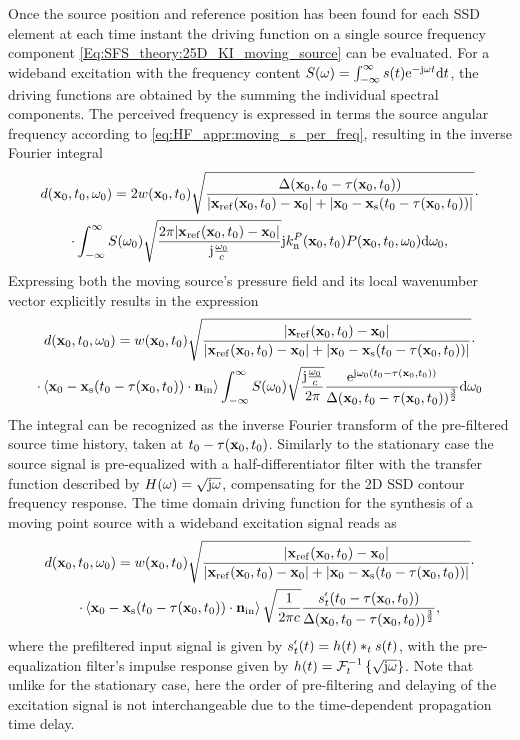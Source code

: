 Once the source position and reference position has been found for each SSD element at each time instant the driving function on a single source frequency component \eqref{Eq:SFS_theory:25D_KI_moving_source} can be evaluated.
For a wideband excitation with the frequency content $S(\omega) = \int_{-\infty}^{\infty} s(t) \mathrm{e}^{-\mathrm{j} \omega t} \mathrm{d} t$, the driving functions are obtained by the summing the individual spectral components.
The perceived frequency is expressed in terms the source angular frequency according to \eqref{eq:HF_appr:moving_s_per_freq}, resulting in the inverse Fourier integral
\begin{multline}
\small
d(\mathbf{x}_0,t_0,\omega_0) =2 w(\mathbf{x}_0,t_0) 
\sqrt{\frac{\Delta(\mathbf{x}_0,t_0-\tau(\mathbf{x}_0,t_0))}{|\mathbf{x}_{\mathrm{ref}}(\mathbf{x}_0,t_0)-\mathbf{x}_0|+|\mathbf{x}_0 - \mathbf{x}_{\mathrm{s}}(t_0-\tau(\mathbf{x}_0,t_0))|}}
\cdot \\ \cdot
 \int_{-\infty}^{\infty} S(\omega_0)
\sqrt{\frac{2\pi |\mathbf{x}_{\mathrm{ref}}(\mathbf{x}_0,t_0)-\mathbf{x}_0|}{\mathrm{j} \frac{\omega_0}{c} }}
\mathrm{j} k_{\mathrm{n}}^P(\mathbf{x}_0,t_0) P(\mathbf{x}_0,t_0,\omega_0) \mathrm{d} \omega_0,
\end{multline}
Expressing both the moving source's pressure field and its local wavenumber vector explicitly results in the expression
\begin{multline}
\small
d(\mathbf{x}_0,t_0,\omega_0) = w(\mathbf{x}_0,t_0) 
\sqrt{\frac{|\mathbf{x}_{\mathrm{ref}}(\mathbf{x}_0,t_0)-\mathbf{x}_0| }{|\mathbf{x}_{\mathrm{ref}}(\mathbf{x}_0,t_0)-\mathbf{x}_0|+|\mathbf{x}_0 - \mathbf{x}_{\mathrm{s}}(t_0-\tau(\mathbf{x}_0,t_0))|}}
\cdot \\ \cdot
\left< \mathbf{x}_0 -\mathbf{x}_{\mathrm{s}}(t_0-\tau(\mathbf{x}_0,t_0)) \cdot \mathbf{n}_{\mathrm{in}} \right>
\int_{-\infty}^{\infty} S(\omega_0)
\sqrt{\frac{\mathrm{j} \frac{\omega_0}{c}}{2\pi}}
\frac{\mathrm{e}^{\mathrm{j} \omega_0\left( t_0 - \tau( \mathbf{x}_0,t_0 )\right)}}{\Delta(\mathbf{x}_0,t_0-\tau( \mathbf{x}_0, t_0 ))^{\frac{3}{2}}}
 \mathrm{d} \omega_0
\end{multline}
The integral can be recognized as the inverse Fourier transform of the pre-filtered source time history, taken at $t_0 - \tau( \mathbf{x}_0,t_0 )$.
Similarly to the stationary case the source signal is pre-equalized with a half-differentiator filter with the transfer function described by $H(\omega) = \sqrt{\mathrm{j} \omega}$, compensating for the 2D SSD contour frequency response.
The time domain driving function for the synthesis of a moving point source with a wideband excitation signal reads as
\begin{multline}
\small
d(\mathbf{x}_0,t_0,\omega_0) = w(\mathbf{x}_0,t_0) 
\sqrt{\frac{|\mathbf{x}_{\mathrm{ref}}(\mathbf{x}_0,t_0)-\mathbf{x}_0| }{|\mathbf{x}_{\mathrm{ref}}(\mathbf{x}_0,t_0)-\mathbf{x}_0|+|\mathbf{x}_0 - \mathbf{x}_{\mathrm{s}}(t_0-\tau(\mathbf{x}_0,t_0))|}}
\cdot \\ \cdot
\left< \mathbf{x}_0 -\mathbf{x}_{\mathrm{s}}(t_0-\tau(\mathbf{x}_0,t_0)) \cdot \mathbf{n}_{\mathrm{in}} \right>
\sqrt{\frac{1}{2\pi c}}
\frac{ s^{\nshortmid}_t(t_0 - \tau( \mathbf{x}_0,t_0 )) }{\Delta(\mathbf{x}_0,t_0-\tau( \mathbf{x}_0, t_0 ))^{\frac{3}{2}}},
\end{multline}
where the prefiltered input signal is given by $ s^{\nshortmid}_t(t) = h(t) \ast_{t} s(t)$, with the pre-equalization filter's impulse response given by $h(t) = \mathcal{F}^{-1}_t\left\{ \sqrt{\mathrm{j} \omega} \right\}$.
Note that unlike for the stationary case, here the order of pre-filtering and delaying of the excitation signal is not interchangeable due to the time-dependent propagation time delay.

